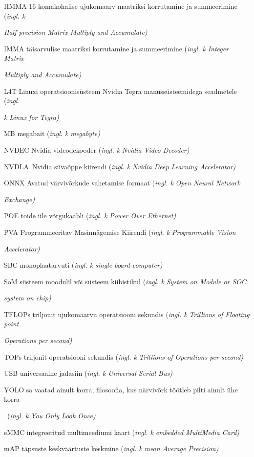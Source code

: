 \documentclass[12pt,a4paper]{report}
\begin{document}
HMMA 16 komakohalise ujukomaarv maatriksi korrutamine ja summeerimine (\emph{ingl. k}

\emph{Half precision Matrix Multiply and Accumulate)}

IMMA täisarvulise maatriksi korrutamine ja summeerimine (\emph{ingl. k} \emph{Integer Matrix}

\emph{Multiply and Accumulate)}

L4T Linuxi operatsioonisüsteem Nvidia Tegra manussüsteemidega seadmetele (\emph{ingl.}

\emph{k} \emph{Linux for Tegra)}

MB megabait (\emph{ingl. k} \emph{megabyte)}

NVDEC Nvidia videodekooder (\emph{ingl. k} \emph{Nvidia Video Decoder)}

NVDLA~Nvidia süvaõppe kiirendi (\emph{ingl. k} \emph{Nvidia Deep Learning Accelerator)}

ONNX Avatud värvivõrkude vahetamise formaat (\emph{ingl. k} \emph{Open Neural Network}

\emph{Exchange)}

POE toide üle võrgukaabli (\emph{ingl. k} \emph{Power Over Ethernet)}

PVA Programmeeritav Masinnägemise Kiirendi (\emph{ingl. k} \emph{Programmable Vision}

\emph{Accelerator)}

SBC monoplaatarvuti (\emph{ingl. k} \emph{single board computer)}

SoM süsteem moodulil või süsteem kiibistikul (\emph{ingl. k} \emph{System on Module or SOC}

\emph{system on chip)}

TFLOPs triljonit ujukomaarvu operatsiooni sekundis (\emph{ingl. k} \emph{Trillions of Floating point}

\emph{Operations per second)}

TOPs triljonit operatsiooni sekundis (\emph{ingl. k} \emph{Trillions of Operations per second)}

USB universaalne jadasiin (\emph{ingl. k} \emph{Universal Serial Bus)}

YOLO sa vaatad ainult korra, filosoofia, kus närvivõrk töötleb pilti ainult ühe korra

~(\emph{ingl. k} \emph{You Only Look Once)}

eMMC integreeritud multimeediumi kaart (\emph{ingl. k} \emph{embedded MultiMedia Card)}

mAP täpsuste keskväärtuste keskmine (\emph{ingl. k} \emph{mean Average Precision)}
\end{document}
